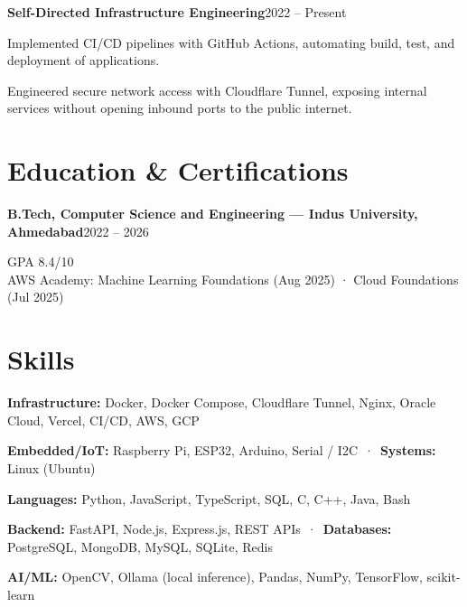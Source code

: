 \documentclass[10pt,a4paper]{article}
\newcommand{\entry}[2]{%
  \textbf{#1}\hfill{\small #2}\par\vspace{0.12em}}
\begin{document}
\entry{Self-Directed Infrastructure Engineering}{2022 -- Present}
\begin{tight}
  \item Implemented CI/CD pipelines with GitHub Actions, automating build, test, and
        deployment of applications.
  \item Engineered secure network access with Cloudflare Tunnel, exposing internal
        services without opening inbound ports to the public internet.
\end{tight}

\section{Education \& Certifications}
\entry{B.Tech, Computer Science and Engineering — Indus University, Ahmedabad}{2022 -- 2026}
GPA 8.4/10\\[0.2em]
{\small AWS Academy: Machine Learning Foundations (Aug 2025) · Cloud Foundations (Jul 2025)}

\section{Skills}
\setlength{\parskip}{0.08em}%
\textbf{Infrastructure:} Docker, Docker Compose, Cloudflare Tunnel, Nginx, Oracle Cloud, Vercel, CI/CD, AWS, GCP

\textbf{Embedded/IoT:} Raspberry Pi, ESP32, Arduino, Serial / I2C \,·\, \textbf{Systems:} Linux (Ubuntu)

\textbf{Languages:} Python, JavaScript, TypeScript, SQL, C, C++, Java, Bash

\textbf{Backend:} FastAPI, Node.js, Express.js, REST APIs \,·\, \textbf{Databases:} PostgreSQL, MongoDB, MySQL, SQLite, Redis

\textbf{AI/ML:} OpenCV, Ollama (local inference), Pandas, NumPy, TensorFlow, scikit-learn
\end{document}
